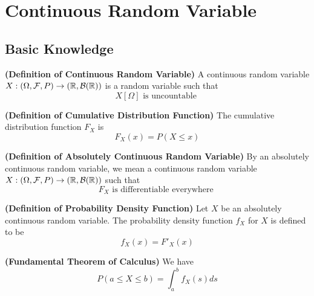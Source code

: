 \documentclass{report}
\begin{document}
\chapter{Continuous Random Variable}
\section{Basic Knowledge}
\begin{definition}
\label{2.1.1}
\textbf{(Definition of Continuous Random Variable)} A continuous random variable $X:(\Omega,\mathcal{F},P)\rightarrow (\mathbb{R},\mathcal{B}(\mathbb{R}))$ is a random variable such that 
\begin{equation}
X[\Omega]\text{ is uncountable }
\end{equation}
\end{definition}
\begin{definition}
\label{2.1.2}
\textbf{(Definition of Cumulative Distribution Function)} The cumulative distribution function $F_X$ is 
 \begin{equation}
F_X(x)=P(X\leq x)
\end{equation}
\end{definition}
\begin{definition}
\label{2.1.3}
\textbf{(Definition of Absolutely Continuous Random Variable)} By an absolutely continuous random variable, we mean a continuous random variable $X:(\Omega,\mathcal{F},P)\rightarrow (\mathbb{R},\mathcal{B}(\mathbb{R}))$ such that
\begin{equation}
F_X\text{ is differentiable everywhere }
\end{equation}
\end{definition}
\begin{definition}
\label{2.1.4}
\textbf{(Definition of Probability Density Function)} Let $X$ be an absolutely continuous random variable. The probability density function $f_X$ for $X$ is defined to be
\begin{equation}
f_X(x)=F'_X(x)
\end{equation}
\end{definition}
\begin{theorem}
\label{2.1.5}
\textbf{(Fundamental Theorem of Calculus)} We have
\begin{equation}
P(a\leq X\leq b)=\int_a^b f_X(s)ds
\end{equation}
\end{theorem}
\end{document}
